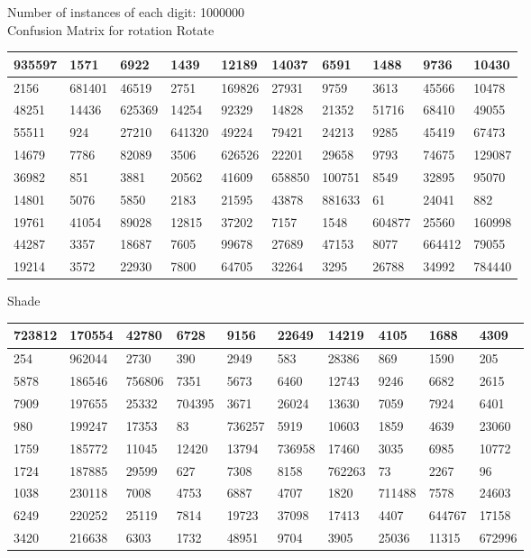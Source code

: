 \iffalse
Number of instances of each digit: 1000000 \\
Confusion Matrix for rotation
Rotate
\begin{table}
\begin{tabular}{|l|l|l|l|l|l|l|l|l|l|}
\hline
935597 & 1571 & 6922 & 1439 & 12189 & 14037 & 6591 & 1488 & 9736 & 10430 \\ \hline
2156 & 681401 & 46519 & 2751 & 169826 & 27931 & 9759 & 3613 & 45566 & 10478 \\ \hline
48251 & 14436 & 625369 & 14254 & 92329 & 14828 & 21352 & 51716 & 68410 & 49055 \\ \hline
55511 & 924 & 27210 & 641320 & 49224 & 79421 & 24213 & 9285 & 45419 & 67473 \\ \hline
14679 & 7786 & 82089 & 3506 & 626526 & 22201 & 29658 & 9793 & 74675 & 129087 \\ \hline
36982 & 851 & 3881 & 20562 & 41609 & 658850 & 100751 & 8549 & 32895 & 95070 \\ \hline
14801 & 5076 & 5850 & 2183 & 21595 & 43878 & 881633 & 61 & 24041 & 882 \\ \hline
19761 & 41054 & 89028 & 12815 & 37202 & 7157 & 1548 & 604877 & 25560 & 160998 \\ \hline
44287 & 3357 & 18687 & 7605 & 99678 & 27689 & 47153 & 8077 & 664412 & 79055 \\ \hline
19214 & 3572 & 22930 & 7800 & 64705 & 32264 & 3295 & 26788 & 34992 & 784440 \\ \hline
\end{tabular}
\end{table}

Shade
\begin{table}
\begin{tabular}{|l|l|l|l|l|l|l|l|l|l|}
\hline
723812 & 170554 & 42780 & 6728 & 9156 & 22649 & 14219 & 4105 & 1688 & 4309 \\ \hline
254 & 962044 & 2730 & 390 & 2949 & 583 & 28386 & 869 & 1590 & 205 \\ \hline
5878 & 186546 & 756806 & 7351 & 5673 & 6460 & 12743 & 9246 & 6682 & 2615 \\ \hline
7909 & 197655 & 25332 & 704395 & 3671 & 26024 & 13630 & 7059 & 7924 & 6401 \\ \hline
980 & 199247 & 17353 & 83 & 736257 & 5919 & 10603 & 1859 & 4639 & 23060 \\ \hline
1759 & 185772 & 11045 & 12420 & 13794 & 736958 & 17460 & 3035 & 6985 & 10772 \\ \hline
1724 & 187885 & 29599 & 627 & 7308 & 8158 & 762263 & 73 & 2267 & 96 \\ \hline
1038 & 230118 & 7008 & 4753 & 6887 & 4707 & 1820 & 711488 & 7578 & 24603 \\ \hline
6249 & 220252 & 25119 & 7814 & 19723 & 37098 & 17413 & 4407 & 644767 & 17158 \\ \hline
3420 & 216638 & 6303 & 1732 & 48951 & 9704 & 3905 & 25036 & 11315 & 672996 \\ \hline
\end{tabular}
\end{table}

